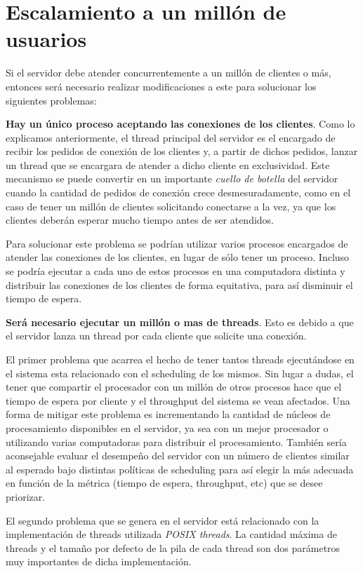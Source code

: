 \section{Escalamiento a un millón de usuarios}

Si el servidor debe atender concurrentemente a un millón de clientes o más, entonces será necesario realizar modificaciones a este para solucionar los siguientes problemas:


\textbf{Hay un único proceso aceptando las conexiones de los clientes}. Como lo explicamos anteriormente, el thread principal del servidor es el encargado de recibir los pedidos de conexión de los clientes y, a partir de dichos pedidos, lanzar un thread que se encargara de atender a dicho cliente en exclusividad. Este mecanismo se puede convertir en un importante \textit{cuello de botella} del servidor cuando la cantidad de pedidos de conexión crece desmesuradamente, como en el caso de tener un millón de clientes solicitando conectarse a la vez, ya que los clientes deberán esperar mucho tiempo antes de ser atendidos. 

Para solucionar este problema se podrían utilizar varios procesos encargados de atender las conexiones de los clientes, en lugar de sólo tener un proceso. Incluso se podría ejecutar a cada uno de estos procesos en una computadora distinta y distribuir las conexiones de los clientes de forma equitativa, para así disminuir el tiempo de espera.


\textbf{Será necesario ejecutar un millón o mas de threads}. Esto es debido a que el servidor lanza un thread por cada cliente que solicite una conexión.

El primer problema que acarrea el hecho de tener tantos threads ejecutándose en el sistema esta relacionado con el scheduling de los mismos. Sin lugar a dudas, el tener que compartir el procesador con un millón de otros procesos hace que el tiempo de espera por cliente y el throughput del sistema se vean afectados. Una forma de mitigar este problema es incrementando la cantidad de núcleos de procesamiento disponibles en el servidor, ya sea con un mejor procesador o utilizando varias computadoras para distribuir el procesamiento. También sería aconsejable evaluar el desempeño del servidor con un número de clientes similar al esperado bajo distintas políticas de scheduling para así elegir la más adecuada en función de la métrica (tiempo de espera, throughput, etc) que se desee priorizar.

El segundo problema que se genera en el servidor está relacionado con la implementación de threads utilizada \textit{POSIX threads}. La cantidad máxima de threads y el tamaño por defecto de la pila de cada thread son dos parámetros muy importantes de dicha implementación.

